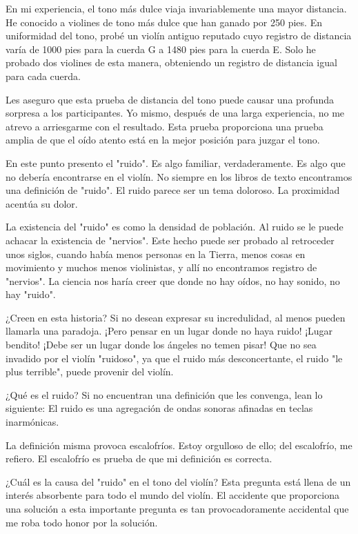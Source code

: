 \documentclass[12pt]{book}
\begin{document}
En mi experiencia, el tono más dulce viaja invariablemente una mayor distancia. He conocido a violines de tono más dulce que han ganado por 250 pies. En uniformidad del tono, probé un violín antiguo reputado cuyo registro de distancia varía de 1000 pies para la cuerda G a 1480 pies para la cuerda E. Solo he probado dos violines de esta manera, obteniendo un registro de distancia igual para cada cuerda.

Les aseguro que esta prueba de distancia del tono puede causar una profunda sorpresa a los participantes. Yo mismo, después de una larga experiencia, no me atrevo a arriesgarme con el resultado. Esta prueba proporciona una prueba amplia de que el oído atento está en la mejor posición para juzgar el tono.

En este punto presento el "ruido". 
Es algo familiar, verdaderamente. 
Es algo que no debería encontrarse en el violín. 
No siempre en los libros de texto encontramos una definición de "ruido". 
El ruido parece ser un tema doloroso. La proximidad acentúa su dolor.

La existencia del "ruido" es como la densidad de población. Al ruido se le puede achacar la existencia de "nervios". Este hecho puede ser probado al retroceder unos siglos, cuando había menos personas en la Tierra, menos cosas en movimiento y muchos menos violinistas, y allí no encontramos registro de "nervios". La ciencia nos haría creer que donde no hay oídos, no hay sonido, no hay "ruido".

¿Creen en esta historia? Si no desean expresar su incredulidad, al menos pueden llamarla una paradoja. ¡Pero pensar en un lugar donde no haya ruido! ¡Lugar bendito! ¡Debe ser un lugar donde los ángeles no temen pisar! Que no sea invadido por el violín "ruidoso", ya que el ruido más desconcertante, el ruido "le plus terrible", puede provenir del violín.

¿Qué es el ruido? Si no encuentran una definición que les convenga, lean lo siguiente: El ruido es una agregación de ondas sonoras afinadas en teclas inarmónicas.

La definición misma provoca escalofríos. Estoy orgulloso de ello; del escalofrío, me refiero. El escalofrío es prueba de que mi definición es correcta.

¿Cuál es la causa del "ruido" en el tono del violín? Esta pregunta está llena de un interés absorbente para todo el mundo del violín. El accidente que proporciona una solución a esta importante pregunta es tan provocadoramente accidental que me roba todo honor por la solución.
\end{document}
